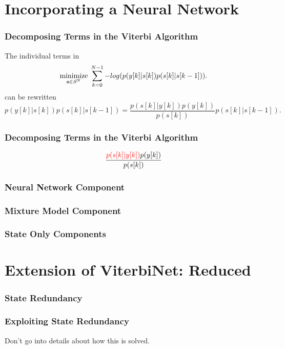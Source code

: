 \documentclass[10pt,tgadventor, onlymath]{beamer}
\begin{document}
\section{Incorporating a Neural Network}

\begin{frame}
\frametitle{Decomposing Terms in the Viterbi Algorithm}
The individual terms in
\begin{equation*}\label{opt_problem}
\underset{\mathbf{s}\in\textit{\cal{S}}^N}{\text{minimize}}\; \sum_{k=0}^{N-1} -log(p(y[k]|s[k])p(s[k]|s[k-1])).
\end{equation*}
can be rewritten 
\begin{equation*}
p(y[k]|s[k])p(s[k]|s[k-1]) = \frac{p(s[k]|y[k])p(y[k])}{p(s[k])}p(s[k]|s[k-1]).
\end{equation*}
\end{frame}

\begin{frame}
	\frametitle{Decomposing Terms in the Viterbi Algorithm}
\begin{equation*}
\frac{\textcolor{red}{p(s[k]|y[k])}p(y[k])}{p(s[k])}
\end{equation*}

\end{frame}

\begin{frame}
	\frametitle{Neural Network Component}

\end{frame}

\begin{frame}
	\frametitle{Mixture Model Component}

\end{frame}

\begin{frame}
	\frametitle{State Only Components}

\end{frame}




\section{Extension of ViterbiNet: Reduced}
\begin{frame}
	\frametitle{State Redundancy}

\end{frame}

\begin{frame}
	\frametitle{Exploiting State Redundancy}
Don't go into details about how this is solved.
\end{frame}
\end{document}
